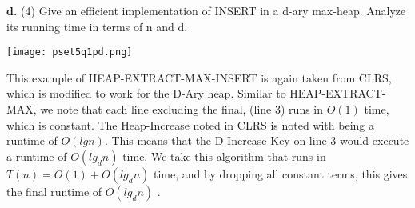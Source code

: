 \documentclass[12pt]{article}
\begin{document}
\textbf{d.} (4) Give an efficient implementation of INSERT in a d-ary max-heap. Analyze its running time in terms of n and d. \\
\begin{center}
\texttt{[image: pset5q1pd.png]} \\
\end{center}
\linebreak
This example of HEAP-EXTRACT-MAX-INSERT is again taken from CLRS, which is modified to work for the D-Ary heap. Similar to HEAP-EXTRACT-MAX, we note that each line excluding the final, (line 3) runs in $O(1)$ time, which is constant. The Heap-Increase noted in CLRS is noted with being a runtime of $O(lg n)$. This means that the D-Increase-Key on line 3 would execute a runtime of $O(lg_d n)$ time. We take this algorithm that runs in $T(n) = O(1) + O(lg_d n)$ time, and by dropping all constant terms, this gives the final runtime of $O(lg_d n)$ . \\
\end{document}
